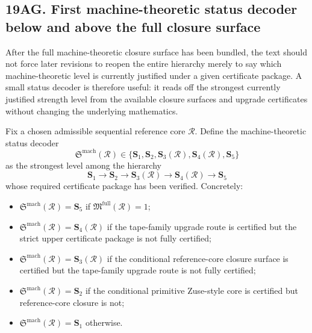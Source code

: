 \subsection*{19AG. First machine-theoretic status decoder below and above the full closure surface}
After the full machine-theoretic closure surface has been bundled, the text should not force later revisions to reopen the entire hierarchy merely to say which machine-theoretic level is currently justified under a given certificate package. A small status decoder is therefore useful: it reads off the strongest currently justified strength level from the available closure surfaces and upgrade certificates without changing the underlying mathematics.

\begin{definition}
Fix a chosen admissible sequential reference core \(\mathcal R\). Define the machine-theoretic status decoder
\[
\mathfrak S^{\mathrm{mach}}(\mathcal R)\in\{\mathbf S_1,\mathbf S_2,\mathbf S_3(\mathcal R),\mathbf S_4(\mathcal R),\mathbf S_5\}
\]
as the strongest level among the hierarchy
\[
\mathbf S_1\longrightarrow \mathbf S_2\longrightarrow \mathbf S_3(\mathcal R)\longrightarrow \mathbf S_4(\mathcal R)\longrightarrow \mathbf S_5
\]
whose required certificate package has been verified. Concretely:
\begin{itemize}[leftmargin=2em]
 \item \(\mathfrak S^{\mathrm{mach}}(\mathcal R)=\mathbf S_5\) if \(\mathfrak M^{\mathrm{full}}(\mathcal R)=1\);
 \item \(\mathfrak S^{\mathrm{mach}}(\mathcal R)=\mathbf S_4(\mathcal R)\) if the tape-family upgrade route is certified but the strict upper certificate package is not fully certified;
 \item \(\mathfrak S^{\mathrm{mach}}(\mathcal R)=\mathbf S_3(\mathcal R)\) if the conditional reference-core closure surface is certified but the tape-family upgrade route is not fully certified;
 \item \(\mathfrak S^{\mathrm{mach}}(\mathcal R)=\mathbf S_2\) if the conditional primitive Zuse-style core is certified but reference-core closure is not;
 \item \(\mathfrak S^{\mathrm{mach}}(\mathcal R)=\mathbf S_1\) otherwise.
\end{itemize}
\end{definition}

